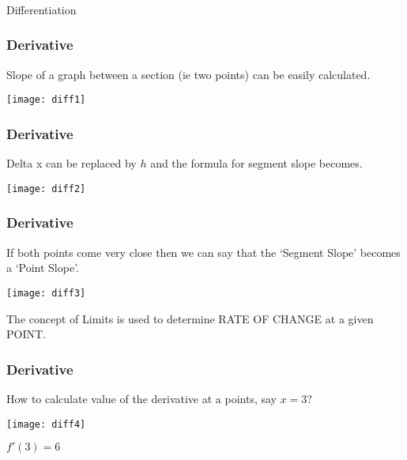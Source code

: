 \newcommand \derv [1] {\frac{d {#1} }{d x}}
\newcommand \dderv [1] {\frac{d^2 {#1} }{d x^2}}

\begin{frame}[fragile]\frametitle{}
\begin{center}
{\Large Differentiation}
\end{center}
\end{frame}


 \begin{frame}[fragile]\frametitle{Derivative}
Slope of a graph between a section (ie two points) can be easily calculated.
\begin{center}
\texttt{[image: diff1]}
\end{center}

\end{frame}


 \begin{frame}[fragile]\frametitle{Derivative}
Delta x can be replaced by $h$ and the formula for segment slope becomes.
\begin{center}
\texttt{[image: diff2]}
\end{center}

\end{frame}

 \begin{frame}[fragile]\frametitle{Derivative}
If both points come very close then we can say that the `Segment Slope' becomes a `Point Slope'.
\begin{center}
\texttt{[image: diff3]}
\end{center}
The concept of Limits is used to determine RATE OF CHANGE at a given POINT.

\end{frame}

 \begin{frame}[fragile]\frametitle{Derivative}
How to calculate value of the derivative at a points, say $x=3$?

\begin{center}
\texttt{[image: diff4]}
\end{center}

$f'(3) = 6$
\end{frame}

